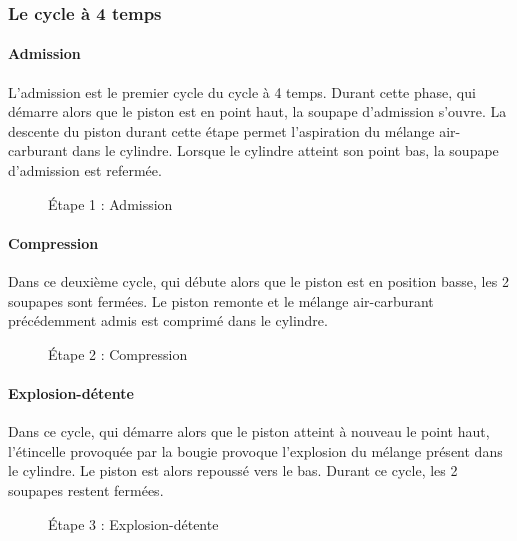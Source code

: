 		\subsubsection{Le cycle à 4 temps}
		\renewcommand{\echelleTikz}{0.5}
		\paragraph{Admission}
		
		L'admission est le premier cycle du cycle à 4 temps. Durant cette phase, qui démarre alors que le piston est en point haut, la soupape d'admission s'ouvre. La descente du piston durant cette étape permet l'aspiration du mélange air-carburant dans le cylindre. Lorsque le cylindre atteint son point bas, la soupape d'admission est refermée.

		\begin{figure}[H]
  		\centering
    		
  		\caption{Étape 1 : Admission}
		\end{figure}	
	
		\paragraph{Compression}
		
		Dans ce deuxième cycle, qui débute alors que le piston est en position basse, les 2 soupapes sont fermées. Le piston remonte et le mélange air-carburant précédemment admis est comprimé dans le cylindre.
		
		\begin{figure}[H]
  		\centering
    		
  		\caption{Étape 2 : Compression}
		\end{figure}	
		
		\paragraph{Explosion-détente}
		
		Dans ce cycle, qui démarre alors que le piston atteint à nouveau le point haut, l'étincelle provoquée par la bougie provoque l'explosion du mélange présent dans le cylindre. Le piston est alors repoussé vers le bas. Durant ce cycle, les 2 soupapes restent fermées.
		
		\begin{figure}[H]
  		\centering
		
  		\caption{Étape 3 : Explosion-détente}
		\end{figure}	
		
